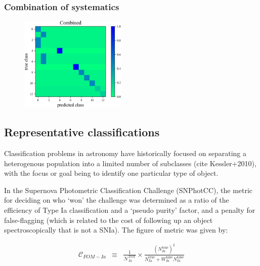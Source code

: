 \subsubsection{Combination of systematics}
\label{sec:combo}

\begin{figure}
	\begin{center}
		\includegraphics[width=0.45\textwidth]{./fig/Combined.png}
		\caption{}
		\label{fig:combo_cm}
	\end{center}
\end{figure}

\subsection{Representative classifications}
\label{sec:realdata}



Classification problems in astronomy have historically focused on separating a heterogenous population into a limited number of subclasses (cite Kessler+2010), with the focus or goal being to identify one particular type of object.

In the Supernova Photometric Classification Challenge (SNPhotCC), the metric for deciding on who `won' the challenge was determined as a ratio of the efficiency of Type Ia classification and a `pseudo purity' factor, and a penalty for false-flagging (which is related to the cost of following up an object spectroscopically that is not a SNIa).
The figure of metric was given by:

\begin{eqnarray}
\mathcal{C}_{FOM-Ia} &\equiv& \frac{1}{\mathcal{N}_{Ia}^{TOT}}\times \frac{(N_{Ia}^{\mathrm{true}})^2}{N_{Ia}^\mathrm{true}+W_{Ia}^\mathrm{false}N_{Ia}^\mathrm{false}}
\end{eqnarray}

